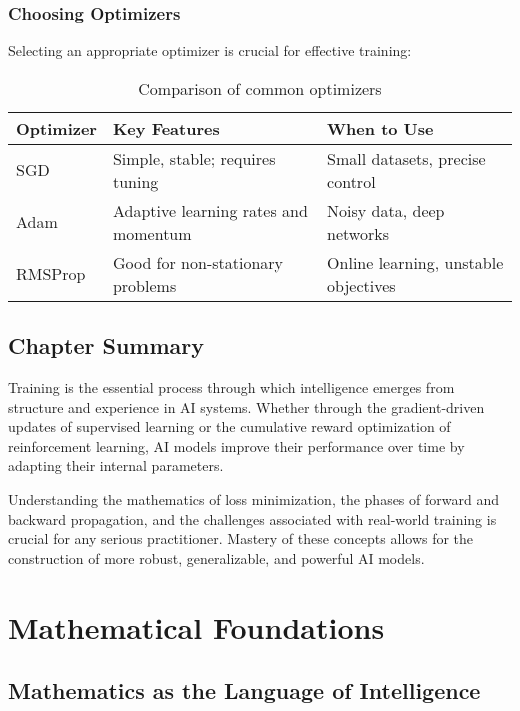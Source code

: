 \documentclass[openany]{book}
\begin{document}
\subsection{Choosing Optimizers}

Selecting an appropriate optimizer is crucial for effective training:

\begin{table}[h]
\centering
\begin{tabular}{|l|l|l|}
\hline
\textbf{Optimizer} & \textbf{Key Features} & \textbf{When to Use} \\ \hline
SGD & Simple, stable; requires tuning & Small datasets, precise control \\ \hline
Adam & Adaptive learning rates and momentum & Noisy data, deep networks \\ \hline
RMSProp & Good for non-stationary problems & Online learning, unstable 
objectives \\ \hline
\end{tabular}
\caption{Comparison of common optimizers}
\end{table}

\section{Chapter Summary}

Training is the essential process through which intelligence emerges from 
structure and experience in AI systems. Whether through the gradient-driven 
updates of supervised learning or the cumulative reward optimization of 
reinforcement learning, AI models improve their performance over time by 
adapting their internal parameters.

Understanding the mathematics of loss minimization, the phases of forward and 
backward propagation, and the challenges associated with real-world training is 
crucial for any serious practitioner. Mastery of these concepts allows for the 
construction of more robust, generalizable, and powerful AI models.

\chapter{Mathematical Foundations}

\section{Mathematics as the Language of Intelligence}
\end{document}
